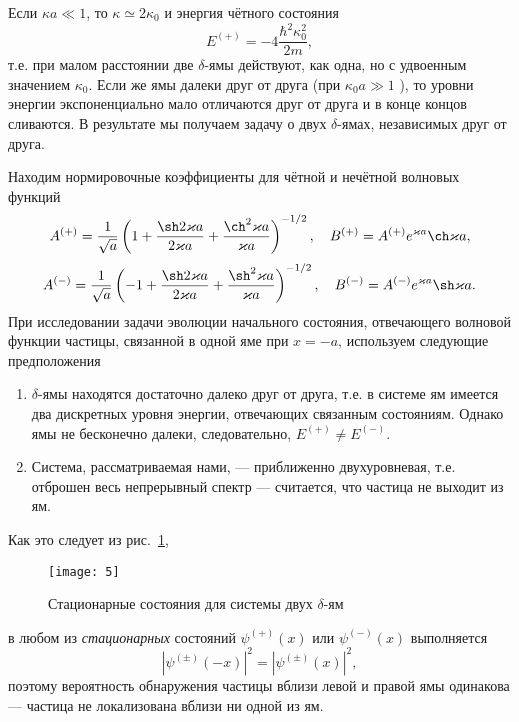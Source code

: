 \documentclass[a4paper]{article}
\begin{document}
\begin{sol}
Если $\kappa a \ll 1$, то $\kappa \simeq 2 \kappa_0$ и энергия
чётного состояния
\[
E^{(+)}= -4 \frac{\hbar^2 \kappa_0^2}{2m}
 ,\]
т.\:е. при малом расстоянии две $\delta$-ямы действуют, как одна,
но с удвоенным значением $\kappa_0$. Если же ямы далеки друг
от друга (при $\kappa_0 a \gg 1$ ), то уровни энергии
экспоненциально мало отличаются друг от друга и в конце концов
сливаются. В результате мы получаем задачу о двух $\delta$-ямах,
независимых друг от друга.

Находим нормировочные коэффициенты для чётной и нечётной волновых
функций
\[
	A^{(+)}= \frac{1}{\sqrt{a} } \left( 1+
	\frac{\sh 2\kappa a}{2 \kappa a}+ \frac{\ch^2 \kappa a}{\kappa a}\right) ^{- 1 /2}, \quad B^{(+)}= A^{(+)}e^{\kappa a}
	\ch \kappa a
 ,\]
\[
	A^{(-)}=\frac{1}{\sqrt{a} }\left( -1+
	\frac{\sh 2 \kappa a}{2\kappa a}+ \frac{\sh^2 \kappa a}{
\kappa a}\right) ^{- 1 /2},\quad B^{(-)}=A^{(-)} e^{\kappa a}
\sh \kappa a
.\] 
При исследовании задачи эволюции начального состояния, отвечающего
 волновой функции частицы, связанной в одной яме при $x=-a$,
используем следующие предположения
\renewcommand{\labelenumi}{\asbuk{enumi})}
\begin{enumerate}
	\item $\delta$-ямы находятся достаточно далеко друг
		от друга, т.\:е. в системе ям имеется два
		дискретных уровня энергии, отвечающих
		связанным состояниям. Однако ямы не бесконечно
		далеки, следовательно, $E^{(+)}\neq E^{(-)}$.
	\item Система, рассматриваемая нами, --- приближенно
		двухуровневая, т.\:е. отброшен весь непрерывный
		спектр --- считается, что частица не выходит
		из ям.
\end{enumerate}
Как это следует из рис.~\ref{fig:5},
\begin{figure}[htpb]
	\centering
	\texttt{[image: 5]}
	\caption{Стационарные состояния для системы двух
	$\delta$-ям}
	\label{fig:5}
\end{figure}
в любом из \emph{стационарных} состояний $\psi^{(+)}(x)$ или
$\psi^{(-)}(x)$ выполняется
\[
	\left| \psi^{(\pm)}(-x) \right| ^2= \left| 
	\psi^{(\pm)}(x)\right| ^2
 ,\]
поэтому вероятность обнаружения частицы вблизи левой и правой
ямы одинакова --- частица не локализована вблизи ни одной из
ям.


\end{sol}
\end{document}
